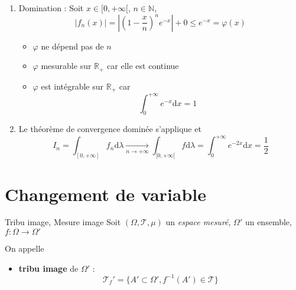 \begin{solution}
\begin{enumerate}
      \item Domination : Soit $x \in [0, + \infty[$, $n \in \mathbb{N}$, 
        \begin{equation}
          |f_n(x) | = |\left( 1 - \frac{x}{n}  \right) ^{n} e ^{-x} | + 0 \le e ^{-x} = \varphi(x)
        \end{equation}

        \begin{itemize}

            \item {\color{red} $\varphi$ ne dépend pas de $n$}

            \item $\varphi$ mesurable sur $\mathbb{R}_+$ car elle est continue 
            \item $\varphi$ est intégrable sur $\mathbb{R} _+$ car 
              \begin{equation}
                \int_{0}^{+ \infty} e ^{-x} \mathrm{d}x = 1
              \end{equation}

        \end{itemize}

      \item Le théorème de convergence dominée s'applique et 
        \begin{equation}
          I _n = \int_{[0, +\infty]}^{} f_n \mathrm{d}\lambda  \underset{n \to +\infty}{\longrightarrow} \int_{[0, +\infty[}^{} f \mathrm{d} \lambda = \int_{0}^{+ \infty} e ^{-2x} \mathrm{d}x = \frac{1}{2} 
        \end{equation}

    \end{enumerate}
\end{solution}




\newpage
\section{Changement de variable} %
\label{sec:Changement de variable}

\begin{Definition}[colbacktitle=red!75!black]{Tribu image, Mesure image}{}
Soit $(\Omega, \mathcal{T}, \mu)$ un \textit{espace mesuré}, $\Omega '$ un ensemble, $f : \Omega \to \Omega'$ 


On appelle 
\begin{itemize}

    \item \textbf{tribu image} de $\Omega'$ : 
      \begin{equation}
        \mathcal{T}_f ' =  \{ A' \subset \Omega', f ^{-1}(A') \in \mathcal{T}\}
      \end{equation}

\end{itemize}
\end{Definition}


